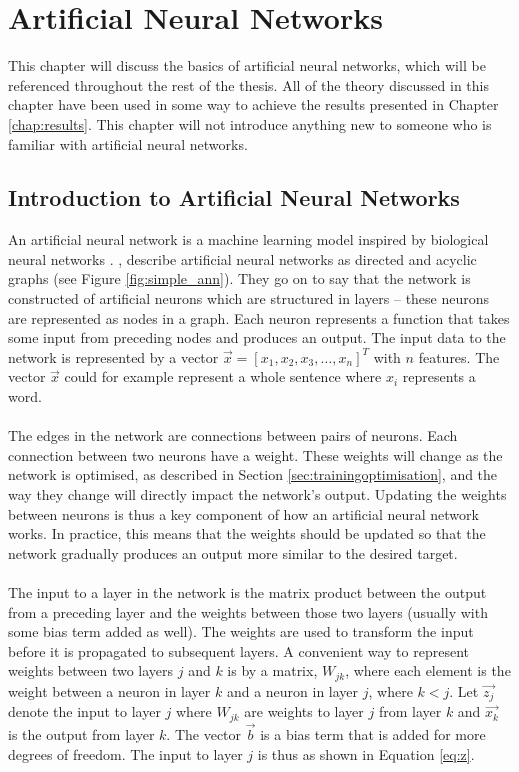 \chapter{Artificial Neural Networks}\label{chap:ann}
This chapter will discuss the basics of artificial neural networks, which will be referenced throughout the rest of the thesis. All of the theory discussed in this chapter have been used in some way to achieve the results presented in Chapter \ref{chap:results}. This chapter will not introduce anything new to someone who is familiar with artificial neural networks.

\section{Introduction to Artificial Neural Networks}
An artificial neural network is a machine learning model inspired by biological neural networks \parencite{lippmann1987introduction}. \cite{Goodfellow-et-al-2016}, describe artificial neural networks as directed and acyclic graphs (see Figure \ref{fig:simple_ann}). They go on to say that the network is constructed of artificial neurons which are structured in layers -- these neurons are represented as nodes in a graph. Each neuron represents a function that takes some input from preceding nodes and produces an output. The input data to the network is represented by a vector $\vec{x} = [x_1, x_2, x_3, \dots, x_n]^T$ with $n$ features. The vector $\vec{x}$ could for example represent a whole sentence where $x_i$ represents a word.
\\\\
The edges in the network are connections between pairs of neurons. Each connection between two neurons have a weight. These weights will change as the network is optimised, as described in Section \ref{sec:trainingoptimisation}, and the way they change will directly impact the network's output. Updating the weights between neurons is thus a key component of how an artificial neural network works. In practice, this means that the weights should be updated so that the network gradually produces an output more similar to the desired target. 
\\\\
The input to a layer in the network is the matrix product between the output from a preceding layer and the weights between those two layers (usually with some bias term added as well). The weights are used to transform the input before it is propagated to subsequent layers. A convenient way to represent weights between two layers $j$ and $k$ is by a matrix, $W_{jk}$, where each element is the weight between a neuron in layer $k$ and a neuron in layer $j$, where $k<j$. Let $\vec{z_j}$ denote the input to layer $j$ where $W_{jk}$ are weights to layer $j$ from layer $k$ and $\vec{x_k}$ is the output from layer $k$. The vector $\vec{b}$ is a bias term that is added for more degrees of freedom. The input to layer $j$ is thus as shown in Equation \ref{eq:z}.
